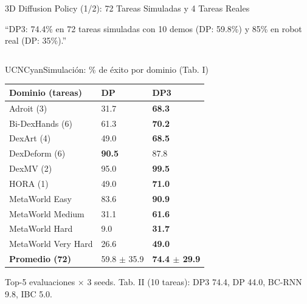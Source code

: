 \documentclass[aspectratio=169,10pt,xcolor={dvipsnames,table}]{beamer}
\newcommand{\BannerFont}{\fontsize{7.5}{9.2}\selectfont\bfseries}       %
\newcommand{\BannerArc}{1.5pt}             %
\newcommand{\BannerRule}{0.5pt}            %
\newcommand{\BannerLeftRule}{2.5pt}        %
\newcommand{\CardHeightTall}{46mm}         %
\newcommand{\BannerCentral}[2][UCNCyan]{%
  \begin{tcolorbox}[
    enhanced,
    colback=#1!10,
    colframe=#1,
    boxrule=\BannerRule,
    leftrule=\BannerLeftRule,
    arc=\BannerArc,
    top=0.35mm, bottom=0.35mm, left=2mm, right=2mm
  ]
    {\BannerFont\raggedright\textcolor{UCNBlue}{#2}\par}
  \end{tcolorbox}%
  \vspace{-2.5mm}%
}
\newcommand{\BannerRef}[1]{{\mdseries\fontsize{5}{6}\selectfont\textcolor{TextDark!65}{\cite{#1}}}} %
\newcommand{\TabFont}{\fontsize{5.3}{6.4}\selectfont}                    %
\begin{document}
\begin{frame}{3D Diffusion Policy (1/2): 72 Tareas Simuladas y 4 Tareas Reales}
  \BannerCentral[UCNCyan]{``DP3: 74.4\% en 72 tareas simuladas con 10 demos (DP: 59.8\%) y 85\% en robot real (DP: 35\%).'' \BannerRef{ze2024dp3}}
  \vspace{0.8mm}
  \begin{columns}[T, onlytextwidth]
    \begin{column}{0.49\textwidth}
      \begin{Card}[height=\CardHeightTall]{UCNCyan}{Simulación: \% de éxito por dominio (Tab. I)}
        {\TabFont
        \setlength{\tabcolsep}{1.4pt}
        \renewcommand{\arraystretch}{1.0}
        \begin{tabular}{@{}L{28mm} C{17mm} C{19mm}@{}}
          \toprule
          \textbf{Dominio (tareas)} & \textbf{DP} & \textbf{DP3} \\
          \midrule
          Adroit (3) & 31.7 & \textbf{68.3} \\
          Bi-DexHands (6) & 61.3 & \textbf{70.2} \\
          DexArt (4) & 49.0 & \textbf{68.5} \\
          DexDeform (6) & \textbf{90.5} & 87.8 \\
          DexMV (2) & 95.0 & \textbf{99.5} \\
          HORA (1) & 49.0 & \textbf{71.0} \\
          MetaWorld Easy & 83.6 & \textbf{90.9} \\
          MetaWorld Medium & 31.1 & \textbf{61.6} \\
          MetaWorld Hard & 9.0 & \textbf{31.7} \\
          MetaWorld Very Hard & 26.6 & \textbf{49.0} \\
          \midrule
           \textbf{Promedio (72)} & 59.8 $\pm$ 35.9 & \textbf{74.4 $\pm$ 29.9} \\
          \bottomrule
        \end{tabular}\par
        \vspace{1mm}
        \textcolor{TextDark!80}{Top-5 evaluaciones $\times$ 3 seeds. Tab. II (10 tareas): DP3 74.4, DP 44.0, BC-RNN 9.8, IBC 5.0.}\par}

\end{Card}
\end{column}
\end{columns}
\end{frame}
\end{document}
